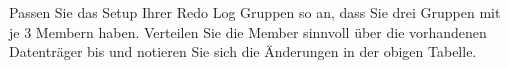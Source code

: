       \item Passen Sie das Setup Ihrer Redo Log Gruppen so an, dass Sie drei Gruppen mit je 3 Membern haben. Verteilen Sie die Member sinnvoll über die vorhandenen Datenträger  bis  und notieren Sie sich die Änderungen in der obigen Tabelle.
